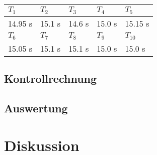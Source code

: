 \documentclass[12pt,a4paper]{article}
\begin{document}
\begin{tabular}{|l|l|l|l|l|}
\hline
$T_{1}$&$T_{2}$&$T_{3}$&$T_{4}$&$T_{5}$\\
\hline
14.95 s&15.1 s&14.6 s&15.0 s&15.15 s\\
\hline
\hline
$T_{6}$&$T_{7}$&$T_{8}$&$T_{9}$&$T_{10}$\\
\hline
15.05 s&15.1 s&15.1 s&15.0 s&15.0 s\\
\hline
\hline
\end{tabular}

\subsection*{Kontrollrechnung}

\subsection*{Auswertung}

\section*{Diskussion}
\end{document}

